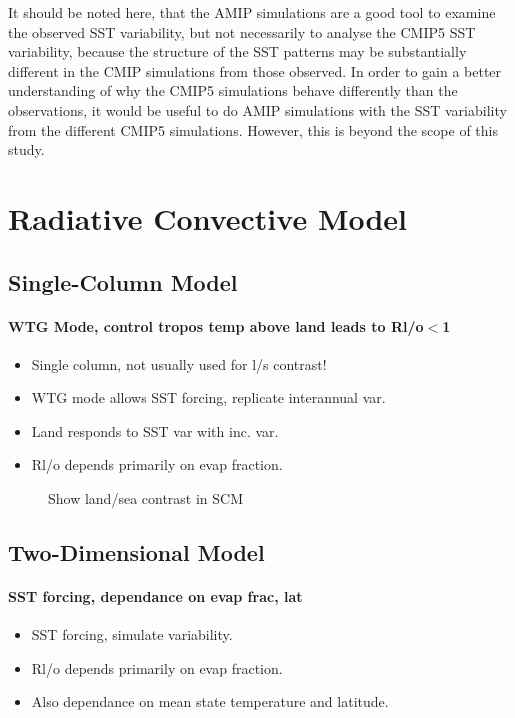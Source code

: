 It should be noted here, that the AMIP simulations are a good tool to examine 
the observed SST variability, but not necessarily to analyse the CMIP5 SST 
variability, because the structure of the SST patterns may be substantially 
different in the CMIP simulations from those observed. In order to gain a better 
understanding of why the CMIP5 simulations behave differently than the 
observations, it would be useful to do AMIP simulations with the SST variability 
from the different CMIP5 simulations. However, this is beyond the scope of this 
study.


\section{Radiative Convective Model}

\subsection{Single-Column Model}

\paragraph{WTG Mode, control tropos temp above land leads to Rl/o$<$1}
\begin{itemize}
	\item Single column, not usually used for l/s contrast!
	\item WTG mode allows SST forcing, replicate interannual var.
	\item Land responds to SST var with inc. var.
	\item Rl/o depends primarily on evap fraction.
\end{itemize}

\begin{figure}[H]
	\caption{Show land/sea contrast in SCM}
\label{fig:SCM_Rlo}
\end{figure}

\subsection{Two-Dimensional Model}

\paragraph{SST forcing, dependance on evap frac, lat}
\begin{itemize}
	\item SST forcing, simulate variability.
	\item Rl/o depends primarily on evap fraction.
	\item Also dependance on mean state temperature and latitude.
\end{itemize}

